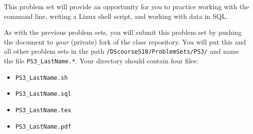 \documentclass[12pt,english]{exam}
\begin{document}
This problem set will provide an opportunity for you to practice working with the command line, writing a Linux shell script, and working with data in SQL.

As with the previous problem sets, you will submit this problem set by pushing the document to \emph{your} (private) fork of the class repository. You will put this and all other problem sets in the path \texttt{/DScourseS18/ProblemSets/PS3/} and name the file \texttt{PS3\_LastName.*}. Your directory should contain four files:
\begin{itemize}
    \item \texttt{PS3\_LastName.sh}
    \item \texttt{PS3\_LastName.sql}
    \item \texttt{PS3\_LastName.tex}
    \item \texttt{PS3\_LastName.pdf}
\end{itemize}
\end{document}
